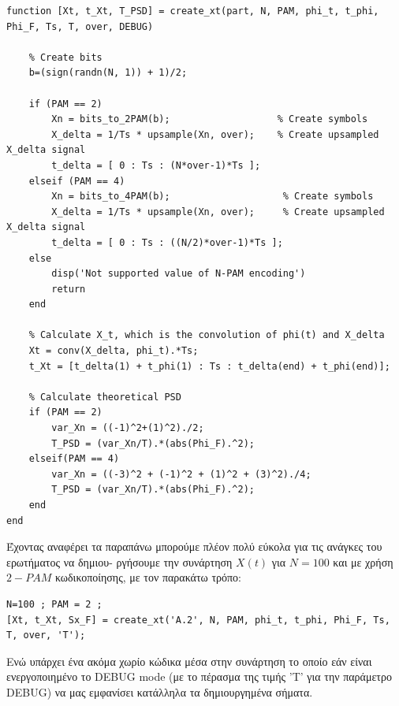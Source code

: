\documentclass[11pt]{article}
\begin{document}
    \begin{lstlisting}[caption = {\texttt{create\_xt.m}}]
function [Xt, t_Xt, T_PSD] = create_xt(part, N, PAM, phi_t, t_phi, Phi_F, Ts, T, over, DEBUG)
    
    % Create bits
    b=(sign(randn(N, 1)) + 1)/2; 

    if (PAM == 2)
        Xn = bits_to_2PAM(b);                   % Create symbols 
        X_delta = 1/Ts * upsample(Xn, over);    % Create upsampled X_delta signal              
        t_delta = [ 0 : Ts : (N*over-1)*Ts ];
    elseif (PAM == 4)
        Xn = bits_to_4PAM(b);                    % Create symbols
        X_delta = 1/Ts * upsample(Xn, over);     % Create upsampled X_delta signal            
        t_delta = [ 0 : Ts : ((N/2)*over-1)*Ts ];
    else
        disp('Not supported value of N-PAM encoding')
        return
    end
    
    % Calculate X_t, which is the convolution of phi(t) and X_delta
    Xt = conv(X_delta, phi_t).*Ts;
    t_Xt = [t_delta(1) + t_phi(1) : Ts : t_delta(end) + t_phi(end)];
    
    % Calculate theoretical PSD
    if (PAM == 2)
        var_Xn = ((-1)^2+(1)^2)./2;
        T_PSD = (var_Xn/T).*(abs(Phi_F).^2);
    elseif(PAM == 4)
        var_Xn = ((-3)^2 + (-1)^2 + (1)^2 + (3)^2)./4;
        T_PSD = (var_Xn/T).*(abs(Phi_F).^2);
    end
end
    \end{lstlisting}
    
    \par \noindent
    Έχοντας αναφέρει τα παραπάνω μπορούμε πλέον πολύ εύκολα για τις ανάγκες του ερωτήματος να δημιου- ργήσουμε την συνάρτηση $X(t)$ για $Ν=100$ και με χρήση $2-PAM$ κωδικοποίησης, με τον παρακάτω τρόπο:
    
    \begin{lstlisting}[caption = {\texttt{Α.2 Create X(t)}}]
N=100 ; PAM = 2 ;
[Xt, t_Xt, Sx_F] = create_xt('A.2', N, PAM, phi_t, t_phi, Phi_F, Ts, T, over, 'T');  
    \end{lstlisting}
    
    \par \noindent
    Ενώ υπάρχει ένα ακόμα χωρίο κώδικα μέσα στην συνάρτηση το οποίο εάν είναι ενεργοποιημένο το DEBUG mode (με το πέρασμα της τιμής 'Τ' για την παράμετρο DEBUG) να μας εμφανίσει κατάλληλα τα δημιουργημένα σήματα. 
    
\end{document}
